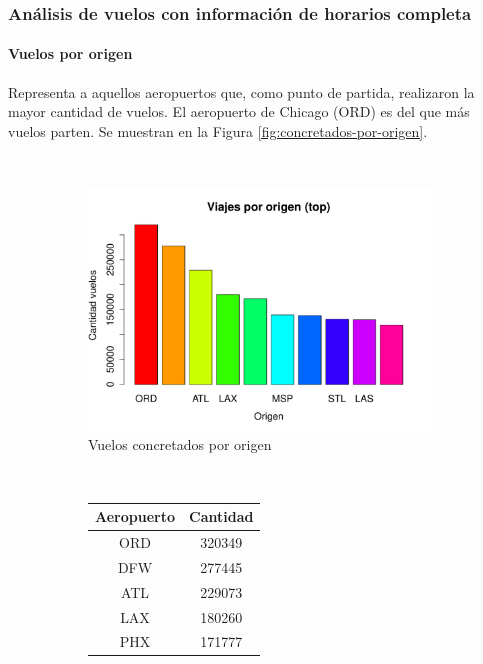 \documentclass[12pt]{article}
\numberwithin{equation}{section}
\numberwithin{table}{section}
\numberwithin{figure}{section}
\begin{document}
\subsubsection{Análisis de vuelos con información de horarios completa}
\paragraph{Vuelos por origen}
Representa a aquellos aeropuertos que, como punto de partida, realizaron la mayor cantidad de vuelos. 
El aeropuerto de Chicago (ORD) es del que más vuelos parten.
Se muestran en la Figura \ref{fig:concretados-por-origen}.

\begin{figure}
        \centering
        ~
        \begin{subfigure}[b]{0.6\textwidth}
                \includegraphics[width=1\columnwidth]{imagenes/completos/viajes-por-origen-top}
                \caption{Vuelos concretados por origen}
        \end{subfigure}
        ~
        \begin{subfigure}[b]{0.3\textwidth}
\begin{tabular}{@{}cc@{}}
\toprule
\textbf{Aeropuerto} & \textbf{Cantidad} \\ \midrule
ORD                 & 320349            \\
DFW                 & 277445            \\
ATL                 & 229073            \\
LAX                 & 180260            \\
PHX                 & 171777            \\

\end{tabular}
\end{subfigure}
\end{figure}
\end{document}
